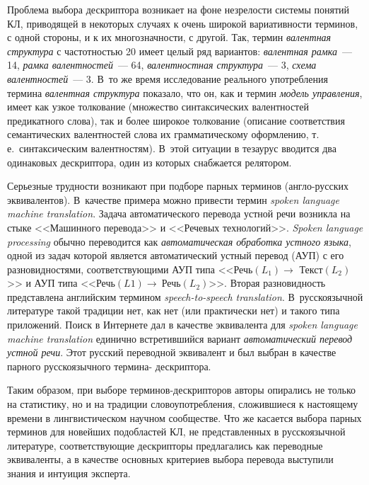 \begin{multicols}{2}
   Проблема выбора дескриптора возникает на фоне незрелости системы понятий КЛ, 
приводящей в некоторых случаях к очень широкой ва\-ри\-а\-тив\-ности терминов, с одной 
стороны, и к их мно\-го\-знач\-ности, с другой. Так, термин \textit{валентная структура} с
частотностью 20 имеет целый ряд вариантов: \textit{валентная рамка}~--- 14, \textit{рамка 
валентностей}~--- 64,\linebreak
\textit{валентностная структура}~--- 3, \textit{схема 
валентностей}~--- 3. В~то же время исследование реального упо\-треб\-ле\-ния термина 
\textit{валентная структура} показало, что он, как и термин \textit{модель управления}, 
имеет как узкое толкование (множество синтаксических валентностей предикатного слова), 
так и более широкое толкование (описание соответствия семантических валентностей слова 
их грамматическому оформлению, т.\,е.\ синтаксическим валентностям). В~этой ситуации в 
тезаурус вводится два одинаковых дескриптора, один из которых снабжается релятором.
    
    Серьезные трудности возникают при подборе парных терминов (англо-русских 
эквивалентов). В~качестве примера можно привести термин \textit{spoken language machine 
translation}. Задача автоматического перевода устной речи возникла на стыке <<Машинного 
перевода>> и <<Речевых технологий>>. \textit{Spoken language processing} обычно 
переводится как \textit{автоматическая обработка устного языка}, одной из задач которой 
является автоматический устный перевод (АУП) с его разновидностями, соответствующими 
АУП типа <<$\mbox{Речь}(L_1) \rightarrow \mbox{\ Текст}(L_2)$>> и АУП типа 
<<$\mbox{Речь}(L1) \rightarrow\ \mbox{Речь}(L_2)$>>. Вторая разновидность представлена 
английским термином \textit{speech-to-speech translation}. В~русскоязычной литературе 
такой традиции нет, как нет (или практически нет) и такого типа приложений. Поиск в 
Интернете дал в качестве эквивалента для \textit{spoken language machine translation} 
единично встретившийся вариант \textit{автоматический перевод устной речи}. Этот 
русский переводной эквивалент и был выбран в качестве парного русскоязычного термина-
дескриптора.
  
  Таким образом, при выборе терминов-де\-скрип\-то\-ров авторы опирались не только на 
статистику, но и на традиции словоупотребления, сложившиеся к настоящему времени в 
лингвистическом научном сообществе. Что же касается выбора парных терминов для 
новейших подобластей КЛ, не представленных в русскоязычной литературе, 
соответствующие дескрипторы предлагались как переводные эквиваленты, а в качестве 
основных критериев выбора перевода выступили знания и интуиция эксперта.


\end{multicols}
